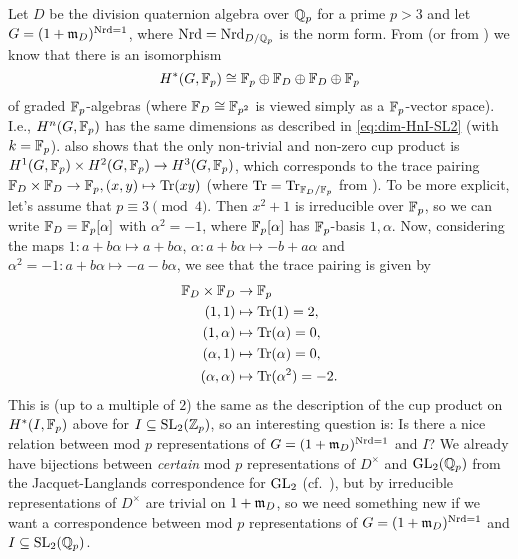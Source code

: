 \begin{remark}\label{rem:quaternion}
  Let $D$ be the division quaternion algebra over $\mathbb{Q}_{p}$ for a prime $p>3$ and let $G = (1+\mathfrak{m}_{D})^{\operatorname{Nrd} = 1}$, where $\operatorname{Nrd} = \operatorname{Nrd}_{D/\mathbb{Q}_{p}}$ is the norm form. From \cite[Sect.~6.3]{Sor} (or from \cite[Prop.~7]{Henn}) we know that there is an isomorphism
  \begin{equation*}
    H^{*}(G,\mathbb{F}_{p}) \cong \mathbb{F}_{p} \oplus \mathbb{F}_{D} \oplus \mathbb{F}_{D} \oplus \mathbb{F}_{p}
  \end{equation*}
  of graded $\mathbb{F}_{p}$-algebras (where $\mathbb{F}_{D} \cong \mathbb{F}_{p^{2}}$ is viewed simply as a $\mathbb{F}_{p}$-vector space). I.e., $H^{n}(G,\mathbb{F}_{p})$ has the same dimensions as described in \eqref{eq:dim-HnI-SL2} (with $k=\mathbb{F}_{p}$). \cite{Sor} also shows that the only non-trivial and non-zero cup product is $H^{1}(G,\mathbb{F}_{p}) \times H^{2}(G,\mathbb{F}_{p}) \to H^{3}(G,\mathbb{F}_{p})$, which corresponds to the trace pairing $\mathbb{F}_{D} \times \mathbb{F}_{D} \to \mathbb{F}_{p}, (x,y) \mapsto \operatorname{Tr}(xy)$ (where $\operatorname{Tr} = \operatorname{Tr}_{\mathbb{F}_{D}/\mathbb{F}_{p}}$ from \cite[Def.~2.5]{Neukirch}). To be more explicit, let's assume that $p \equiv 3 \pmod{4}$. Then $x^{2}+1$ is irreducible over $\mathbb{F}_{p}$, so we can write $\mathbb{F}_{D} = \mathbb{F}_{p}[\alpha]$ with $\alpha^{2} = -1$, where $\mathbb{F}_{p}[\alpha]$ has $\mathbb{F}_{p}$-basis $1,\alpha$. Now, considering the maps $1\colon a+b\alpha \mapsto a+b\alpha$, $\alpha\colon a+b\alpha \mapsto -b + a\alpha$ and $\alpha^{2}=-1 \colon a+b\alpha \mapsto -a-b\alpha$, we see that the trace pairing is given by
  \begin{align*}
    \mathbb{F}_{D} \times \mathbb{F}_{D} &\to \mathbb{F}_{p} \\
    (1,1) &\mapsto \operatorname{Tr}(1) = 2, \\
    (1,\alpha) &\mapsto \operatorname{Tr}(\alpha) = 0, \\
    (\alpha,1) &\mapsto \operatorname{Tr}(\alpha) = 0, \\
    (\alpha,\alpha) &\mapsto \operatorname{Tr}(\alpha^{2}) = -2.
  \end{align*}
  This is (up to a multiple of $2$) the same as the description of the cup product on $H^{*}(I,\mathbb{F}_{p})$ above for $I \subseteq \operatorname{SL}_{2}(\mathbb{Z}_{p})$, so an interesting question is: Is there a nice relation between mod $p$ representations of $G = (1+\mathfrak{m}_{D})^{\operatorname{Nrd} = 1}$ and $I$? We already have bijections between \emph{certain} mod $p$ representations of $D^{\times}$ and $\operatorname{GL}_{2}(\mathbb{Q}_{p})$ from the Jacquet-Langlands correspondence for $\operatorname{GL}_{2}$ (cf.\ \cite{JL}), but by \cite[Rem.~4.5]{JL-remark} irreducible representations of $D^{\times}$ are trivial on $1+\mathfrak{m}_{D}$, so we need something new if we want a correspondence between mod $p$ representations of $G = (1+\mathfrak{m}_{D})^{\operatorname{Nrd} = 1}$ and $I \subseteq \operatorname{SL}_{2}(\mathbb{Q}_{p})$.


\end{remark}
